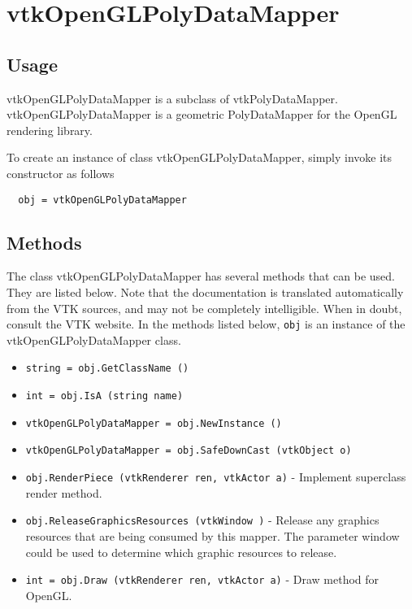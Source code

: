 \section{vtkOpenGLPolyDataMapper}

\subsection{Usage}

 vtkOpenGLPolyDataMapper is a subclass of vtkPolyDataMapper.
 vtkOpenGLPolyDataMapper is a geometric PolyDataMapper for the OpenGL 
 rendering library.

To create an instance of class vtkOpenGLPolyDataMapper, simply
invoke its constructor as follows
\begin{verbatim}
  obj = vtkOpenGLPolyDataMapper
\end{verbatim}
\subsection{Methods}

The class vtkOpenGLPolyDataMapper has several methods that can be used.
  They are listed below.
Note that the documentation is translated automatically from the VTK sources,
and may not be completely intelligible.  When in doubt, consult the VTK website.
In the methods listed below, \verb|obj| is an instance of the vtkOpenGLPolyDataMapper class.
\begin{itemize}
\item  \verb|string = obj.GetClassName ()|

\item  \verb|int = obj.IsA (string name)|

\item  \verb|vtkOpenGLPolyDataMapper = obj.NewInstance ()|

\item  \verb|vtkOpenGLPolyDataMapper = obj.SafeDownCast (vtkObject o)|

\item  \verb|obj.RenderPiece (vtkRenderer ren, vtkActor a)| -  Implement superclass render method.

\item  \verb|obj.ReleaseGraphicsResources (vtkWindow )| -  Release any graphics resources that are being consumed by this mapper.
 The parameter window could be used to determine which graphic
 resources to release.

\item  \verb|int = obj.Draw (vtkRenderer ren, vtkActor a)| -  Draw method for OpenGL.

\end{itemize}
